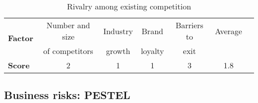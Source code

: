 {\begin{table}[H]
\centering
\caption{Rivalry among existing competition}
\label{tab:rivalry}
\begin{tabular}{lcccccc}
\toprule
\multirow{2}{*}{\textbf{Factor}} & Number and size       & Industry   & Brand          & Barriers to    & Average   \\
                                 & of competitors        & growth     & loyalty        & exit           &           \\\midrule
\textbf{Score}                   & 2                     & 1          & 1              & 3              & 1.8       \\\bottomrule
\end{tabular}%
\end{table}

\subsection{Business risks: PESTEL}

}
